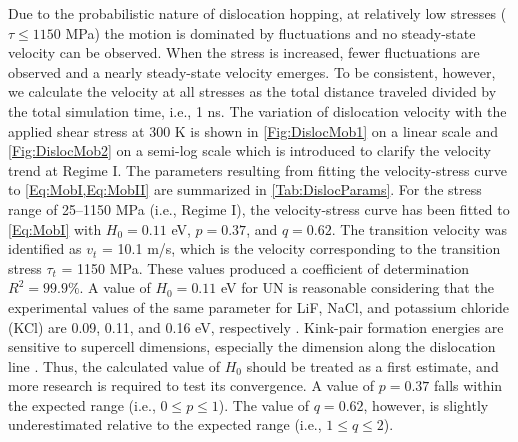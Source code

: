 \documentclass[applsci,article,submit,pdftex,moreauthors]{Definitions/mdpi}
\newcommand{\?}{\stackrel{?}{=}}
\begin{document}
Due to the probabilistic nature of dislocation hopping, at relatively low stresses ($\tau \leq 1150$ MPa) the motion is dominated by fluctuations and no steady-state velocity can be observed. When the stress is increased, fewer fluctuations are observed and a nearly steady-state velocity emerges. To be consistent, however, we calculate the velocity at all stresses as the total distance traveled divided by the total simulation time, i.e., 1 ns. The variation of dislocation velocity with the applied shear stress at 300 K is shown in \cref{Fig:DislocMob1} on a linear scale and \cref{Fig:DislocMob2} on a semi-log scale which is introduced to clarify the velocity trend at Regime I. The parameters resulting from fitting the velocity-stress curve to \cref{Eq:MobI,Eq:MobII} are summarized in \cref{Tab:DislocParams}. For the stress range of 25--1150 MPa (i.e., Regime I), the velocity-stress curve has been fitted to \cref{Eq:MobI} with $H_0 = 0.11$ eV, $p=0.37$, and $q=0.62$. The transition velocity was identified as $v_t$ = 10.1 m/s, which is the velocity corresponding to the transition stress $\tau_t$ = 1150 MPa. These values produced a coefficient of determination $R^2 = 99.9\%$. A value of $H_0 = 0.11$ eV for UN is reasonable considering that the experimental values of the same parameter for LiF, NaCl, and potassium chloride (KCl) are 0.09, 0.11, and 0.16 eV, respectively \cite{Haasen1985}. Kink-pair formation energies are sensitive to supercell dimensions, especially the dimension along the dislocation line \cite{Ventelon2009}. Thus, the calculated value of $H_0$ should be treated as a first estimate, and more research is required to test its convergence. A value of $p = 0.37$ falls within the expected range (i.e., $0 \leq p \leq 1$). The value of $q = 0.62$, however, is slightly underestimated relative to the expected range (i.e., $1 \leq q \leq 2$).
\end{document}
